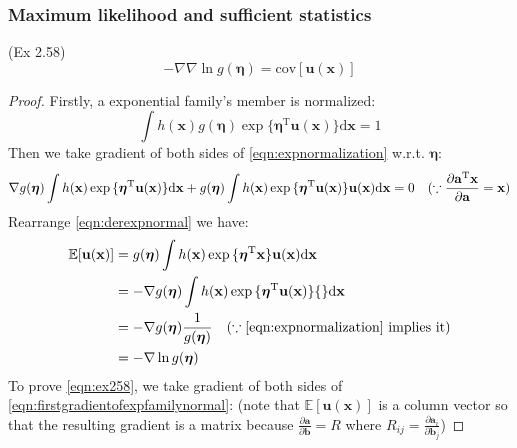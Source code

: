 \subsubsection{Maximum likelihood and sufficient statistics}
(Ex 2.58)
\begin{equation}
-\nabla\nabla\ln{}g(\boldsymbol{\eta})=\text{cov}[\mathbf{u}(\mathbf{x})]
\label{eqn:ex258}
\end{equation}
\begin{proof}
Firstly, a exponential family's member is normalized:
\begin{equation}
\int{}h(\mathbf{x})g(\boldsymbol{\eta})\exp{}\{\boldsymbol{\eta}^{\mathrm{T}}\mathbf{u}(\mathbf{x})\}\text{d}\mathbf{x}=1
\label{eqn:expnormalization}
\end{equation}
Then we take gradient of both sides of \eqref{eqn:expnormalization} w.r.t. $\boldsymbol{\eta}$:
\begin{equation}
\nabla{}g(\boldsymbol{\eta})\int{}h(\mathbf{x})\exp{}\{\boldsymbol{\eta}^{\mathrm{T}}\mathbf{u}(\mathbf{x})\}\text{d}\mathbf{x}+g(\boldsymbol{\eta})\int{}h(\mathbf{x})\exp{}\{\boldsymbol{\eta}^{\mathrm{T}}\mathbf{u}(\mathbf{x})\}\mathbf{u}(\mathbf{x})\text{d}\mathbf{x}=0\quad{}(\because{}\frac{\partial{}\mathbf{a}^{\mathrm{T}}\mathbf{x}}{\partial{}\mathbf{a}}=\mathbf{x})\\
\label{eqn:derexpnormal}
\end{equation}
Rearrange \eqref{eqn:derexpnormal} we have:
\begin{equation}
\begin{split}
\mathbb{E}[\mathbf{u}(\mathbf{x})]&=g(\boldsymbol{\eta})\int{}h(\mathbf{x})\exp{}\{\boldsymbol{\eta}^{\mathrm{T}}\mathbf{x}\}\mathbf{u}(\mathbf{x})\text{d}\mathbf{x}\\
&=-\nabla{}g(\boldsymbol{\eta})\int{}h(\mathbf{x})\exp{}\{\boldsymbol{\eta}^{\mathrm{T}}\mathbf{u}(\mathbf{x})\}\{\}\text{d}\mathbf{x}\\
&=-\nabla{}g(\boldsymbol{\eta})\frac{1}{g(\boldsymbol{\eta})}\quad{}(\because{}\text{\eqref{eqn:expnormalization} implies it})\\
&=-\nabla{}\ln{}g(\boldsymbol{\eta})
\end{split}
\label{eqn:firstgradientofexpfamilynormal}
\end{equation}
To prove \eqref{eqn:ex258}, we take gradient of both sides of \eqref{eqn:firstgradientofexpfamilynormal}: (note that $\mathbb{E}[\mathbf{u}(\mathbf{x})]$ is a column vector so that the resulting gradient is a matrix because $\frac{\partial{}\mathbf{a}}{\partial{}\mathbf{b}}=R$ where $R_{ij}=\frac{\partial{}\mathbf{a}_i}{\partial{}\mathbf{b}_j}$)

\end{proof}
